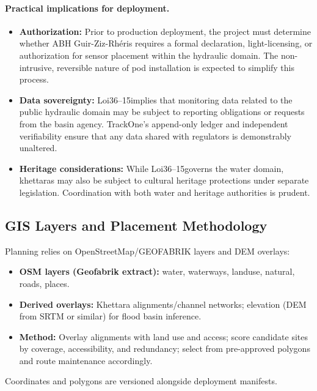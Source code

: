 \paragraph{Practical implications for deployment.}
\begin{itemize}[nosep]
    \item \textbf{Authorization:}
    Prior to production deployment, the project must determine whether \ac{ABH}
    Guir-Ziz-Rhéris requires a formal declaration, light-licensing,
    or authorization for sensor placement within the hydraulic domain.
    The non-intrusive, reversible nature of pod installation is expected to
    simplify this process.
    \item \textbf{Data sovereignty:}
          Loi36--15implies that monitoring data related to the public hydraulic domain
          may be subject to reporting obligations or requests from the basin agency.
          TrackOne's append-only ledger and independent verifiability ensure that any
          data shared with regulators is demonstrably unaltered.
    \item \textbf{Heritage considerations:}
          While Loi36--15governs the water domain, khettaras may also be subject to
          cultural heritage protections under separate legislation.
          Coordination with both water and heritage authorities is prudent.
\end{itemize}

\subsection{GIS Layers and Placement Methodology}
\label{subsec:gis-placement}
Planning relies on OpenStreetMap/GEOFABRIK layers and \ac{DEM} overlays:
\begin{itemize}[nosep]
  \item \textbf{OSM layers (Geofabrik extract):} water, waterways, landuse, natural, roads, places.
  \item \textbf{Derived overlays:} Khettara alignments/channel networks; elevation (\ac{DEM} from \ac{SRTM} or similar) for flood basin inference.
  \item \textbf{Method:} Overlay alignments with land use and access; score candidate sites by coverage, accessibility, and redundancy; select from pre-approved polygons and route maintenance accordingly.
\end{itemize}
Coordinates and polygons are versioned alongside deployment manifests.

